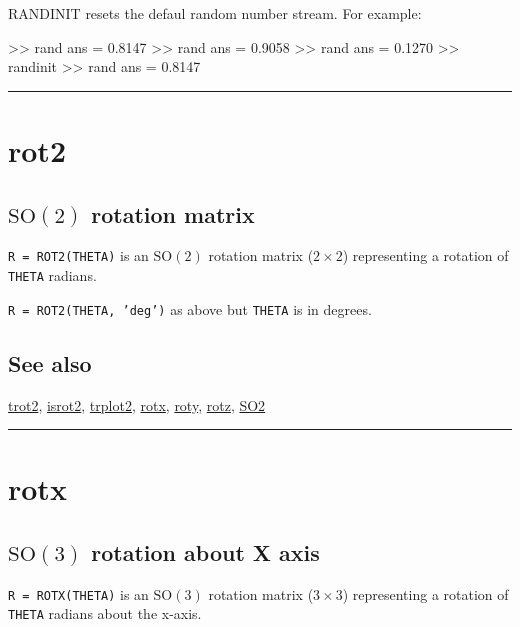 RANDINIT resets the defaul random number stream.  For example:

\begin{Code}
   >> rand
   ans =
      0.8147
   >> rand
   ans =
       0.9058
   >> rand
   ans =
       0.1270
   >> randinit
   >> rand
   ans =
       0.8147

\end{Code}
\vspace{1.5ex}\rule{\textwidth}{1mm}

\hypertarget{rot2}{\section*{rot2}}
\subsection*{$\mbox{SO}(2)$ rotation matrix}


\texttt{R = ROT2(THETA)} is an $\mbox{SO}(2)$ rotation matrix ($2 \times 2$) representing a rotation of \texttt{THETA}
radians.



\texttt{R = ROT2(THETA, 'deg')} as above but \texttt{THETA} is in degrees.


\subsection*{See also}


\hyperlink{trot2}{\color{blue} trot2}, \hyperlink{isrot2}{\color{blue} isrot2}, \hyperlink{trplot2}{\color{blue} trplot2}, \hyperlink{rotx}{\color{blue} rotx}, \hyperlink{roty}{\color{blue} roty}, \hyperlink{rotz}{\color{blue} rotz}, \hyperlink{SO2}{\color{blue} SO2}

\vspace{1.5ex}\rule{\textwidth}{1mm}

\hypertarget{rotx}{\section*{rotx}}
\subsection*{$\mbox{SO}(3)$ rotation about X axis}


\texttt{R = ROTX(THETA)} is an $\mbox{SO}(3)$ rotation matrix ($3 \times 3$) representing a rotation of \texttt{THETA}
radians about the x-axis.



